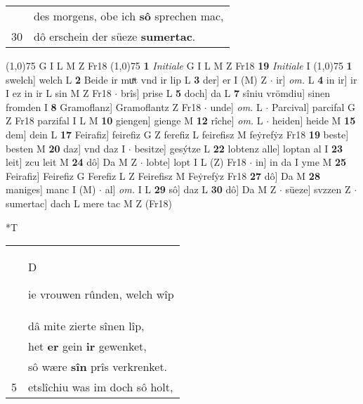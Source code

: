 \documentclass[8pt,a4paper,notitlepage]{article}
\begin{document}
\begin{table}[ht]
\begin{minipage}[t]{0.5\linewidth}
\begin{tabular}{rl}
 & des morgens, obe ich \textbf{sô} sprechen mac,\\ 
30 & dô erschein der süeze \textbf{sumertac}.\\ 
\end{tabular}
\scriptsize
\line(1,0){75} \newline
G I L M Z Fr18 \newline
\line(1,0){75} \newline
\textbf{1} \textit{Initiale} G I L M Z Fr18  \textbf{19} \textit{Initiale} I  \newline
\line(1,0){75} \newline
\textbf{1} swelch] welch L \textbf{2} Beide ir muͯt vnd ir lip L \textbf{3} der] er I (M) Z  $\cdot$ ir] \textit{om.} L \textbf{4} in ir] ir I ez in ir L sin M Z Fr18  $\cdot$ brîs] prise L \textbf{5} doch] da L \textbf{7} sîniu vrömdiu] sinen fromden I \textbf{8} Gramoflanz] Gramoflantz Z Fr18  $\cdot$ unde] \textit{om.} L  $\cdot$ Parcival] parcifal G Z Fr18 parzifal I L M \textbf{10} giengen] gienge M \textbf{12} rîche] \textit{om.} L  $\cdot$ heiden] heide M \textbf{15} dem] dein L \textbf{17} Feirafiz] feirefiz G Z ferefiz L feirefisz M feẏrefẏz Fr18 \textbf{19} beste] besten M \textbf{20} daz] vnd daz I  $\cdot$ besitze] gesýtze L \textbf{22} lobtenz alle] loptan al I \textbf{23} leit] zcu leit M \textbf{24} dô] Da M Z  $\cdot$ lobte] lopt I L (Z) Fr18  $\cdot$ in] in da I yme M \textbf{25} Feirafiz] Feirefiz G Ferefiz L Z Feirefisz M Feẏrefẏz Fr18 \textbf{27} dô] Da M \textbf{28} maniges] manc I (M)  $\cdot$ al] \textit{om.} I L \textbf{29} sô] daz L \textbf{30} dô] Da M Z  $\cdot$ süeze] svzzen Z  $\cdot$ sumertac] dach L mere tac M Z (Fr18) \newline
\end{minipage}
\hspace{0.5cm}
\begin{minipage}[t]{0.5\linewidth}
\small
\begin{center}*T
\end{center}
\begin{tabular}{rl}
 & \begin{large}D\end{large}ie vrouwen rûnden, welch wîp\\ 
 & dâ mite zierte sînen lîp,\\ 
 & het \textbf{er} gein \textbf{ir} gewenket,\\ 
 & sô wære \textbf{sîn} prîs verkrenket.\\ 
5 & etslîchiu was im doch sô holt,\\ 

\end{tabular}
\end{minipage}
\end{table}
\end{document}
